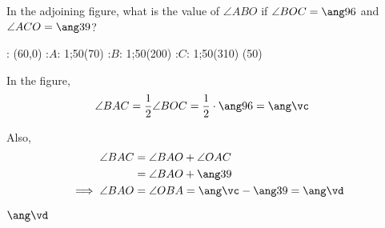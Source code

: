 


\DIVIDE{}\vc
\SUBTRACT\vc\vb\vd

\question[2]  In the adjoining figure, what is the value of $\angle ABO$ if
$\angle BOC = \ang\va$ and $\angle ACO = \ang\vb$?

\watchout

  : (60,0)
  :$A$: 1;50(70)
  :$B$: 1;50(200)
  :$C$: 1;50(310)
\figdrawbegin{}
  (50)
  \figdrawline [2,3,1,4,2]
  \ifprintanswers
    \figdrawline [1,2]
  \fi
\figdrawend
{}

\vspace{1cm}
\centerline{\box\figBoxA}

\begin{solution}[\halfpage]
	In the figure, 
	\begin{align}
 		\angle BAC &= \dfrac{1}{2}\angle BOC = \dfrac{1}{2}\cdot\ang\va = \ang\vc
	\end{align}
	
	Also, 
	\begin{align}
		\angle BAC &= \angle BAO + \angle OAC \\
		           &= \angle BAO + \ang\vb \\
		\implies \angle BAO &= \angle OBA = \ang\vc - \ang\vb = \ang\vd
	\end{align}
\end{solution}
\ifprintanswers\begin{codex}$\ang\vd$\end{codex}\fi
